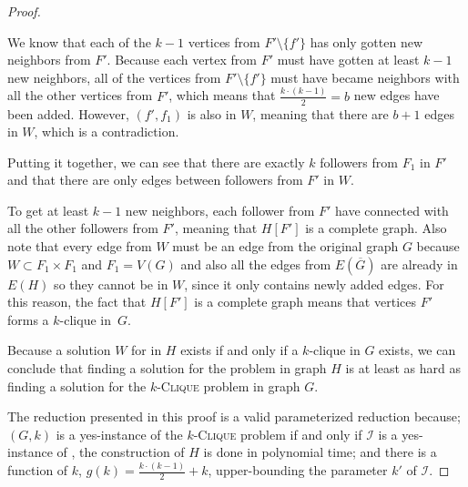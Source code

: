 \begin{proof}
\begin{subproof}
        We know that each of the $k-1$ vertices from $F' \setminus \{f'\}$ has only gotten new neighbors from $F'$.
        Because each vertex from $F'$ must have gotten at least $k-1$ new neighbors,
        all of the vertices from $F' \setminus \{f'\}$ must have became neighbors with all the other vertices from $F'$,
        which means that $\frac{k \cdot (k-1)}{2} = b$ new edges have been added.
        However, $(f',f_1)$ is also in $W$, meaning that there are $b+1$ edges in $W$, which is a contradiction.
    \end{subproof}

    Putting it together, we can see that there are exactly $k$ followers from $F_1$ in $F'$
    and that there are only edges between followers from $F'$ in $W$.
    
    To get at least $k-1$ new neighbors, each follower from $F'$ have connected with all the other
    followers from $F'$, meaning that $H[F']$ is a complete graph.
    Also note that every edge from $W$ must be an edge from the original graph $G$ because $W \subset F_1 \times F_1$ and $F_1 = V(G)$
    and also all the edges from $E(\overline{G})$ are already in $E(H)$ so they cannot be in $W$, since it only contains newly added edges.
    For this reason, the fact that $H[F']$ is a complete graph means that vertices $F'$ forms a $k$-clique in~$G$.

    Because a solution $W$ for \HLshort in $H$ exists if and only if a $k$-clique in $G$ exists,
    we can conclude that finding a solution for the \HL problem in graph $H$ is at least as hard as
    finding a solution for the $k$-\textsc{Clique} problem in graph $G$.

    The reduction presented in this proof is a valid parameterized reduction because;
    $(G, k)$ is a yes-instance of the $k$-\textsc{Clique} problem if and only if $\mathcal{I}$ is a yes-instance of \HLdeg,
    the construction of $H$ is done in polynomial time;
    and there is a function of $k$, $g(k) = \frac{k\cdot(k-1)}{2} + k$, upper-bounding the parameter $k'$ of $\mathcal{I}$.
\end{proof}


